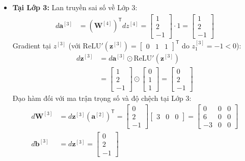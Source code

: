 \begin{itemize}
    \item \textbf{Tại Lớp 3:}
    Lan truyền sai số về Lớp 3:
    \begin{align*}
    d\mathbf{a}^{[3]} &= \left(\mathbf{W}^{[4]}\right)^{\mathsf{T}} dz^{[4]} = \begin{bmatrix} 1 \\ 2 \\ -1 \end{bmatrix} \cdot 1 = \begin{bmatrix} 1 \\ 2 \\ -1 \end{bmatrix}
    \end{align*}
    Gradient tại $z^{[3]}$ (với $\text{ReLU}'(\mathbf{z}^{[3]}) = \begin{bmatrix} 0 & 1 & 1 \end{bmatrix}^{\mathsf{T}}$ do $z_1^{[3]} = -1 < 0$):
    \begin{align*}
    d\mathbf{z}^{[3]} &= d\mathbf{a}^{[3]} \odot \text{ReLU}'(\mathbf{z}^{[3]}) \\
    &= \begin{bmatrix} 1 \\ 2 \\ -1 \end{bmatrix} \odot \begin{bmatrix} 0 \\ 1 \\ 1 \end{bmatrix} = \begin{bmatrix} 0 \\ 2 \\ -1 \end{bmatrix}
    \end{align*}
    Đạo hàm đối với ma trận trọng số và độ chệch tại Lớp 3:
    \begin{align*}
    d\mathbf{W}^{[3]} &= d\mathbf{z}^{[3]} \left(\mathbf{a}^{[2]}\right)^{\mathsf{T}} = \begin{bmatrix} 0 \\ 2 \\ -1 \end{bmatrix} \begin{bmatrix} 3 & 0 & 0 \end{bmatrix} = \begin{bmatrix} 0 & 0 & 0 \\ 6 & 0 & 0 \\ -3 & 0 & 0 \end{bmatrix} \\
    d\mathbf{b}^{[3]} &= d\mathbf{z}^{[3]} = \begin{bmatrix} 0 \\ 2 \\ -1 \end{bmatrix}
    \end{align*}


\end{itemize}
